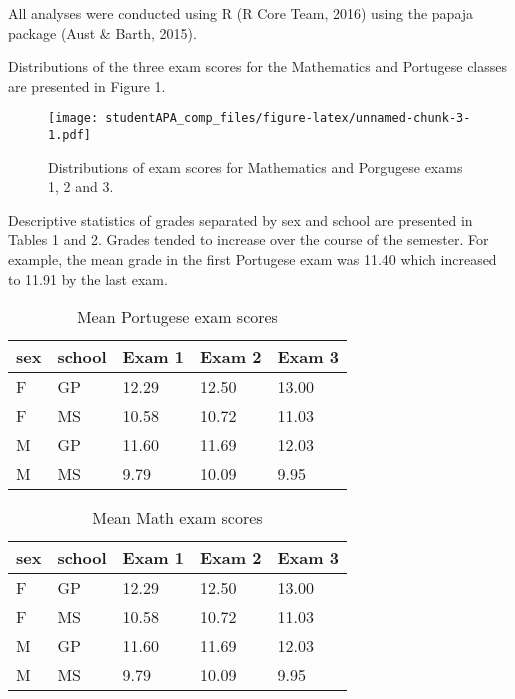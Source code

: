 \documentclass[english,floatsintext,man]{apa6}
\begin{document}
All analyses were conducted using R (R Core Team, 2016) using the papaja
package (Aust \& Barth, 2015).

Distributions of the three exam scores for the Mathematics and Portugese
classes are presented in Figure 1.

\begin{figure}[htbp]
\centering
\texttt{[image: studentAPA\_comp\_files/figure-latex/unnamed-chunk-3-1.pdf]}
\caption{\label{fig:unnamed-chunk-3}Distributions of exam scores for
Mathematics and Porgugese exams 1, 2 and 3.}
\end{figure}

Descriptive statistics of grades separated by sex and school are
presented in Tables 1 and 2. Grades tended to increase over the course
of the semester. For example, the mean grade in the first Portugese exam
was 11.40 which increased to 11.91 by the last exam.

\begin{table}[tbp]
\begin{center}
\begin{threeparttable}
\caption{Mean Portugese exam scores}
\begin{tabular}{lllll}
\toprule
sex & \multicolumn{1}{c}{school} & \multicolumn{1}{c}{Exam 1} & \multicolumn{1}{c}{Exam 2} & \multicolumn{1}{c}{Exam 3}\\
\midrule
F & GP & 12.29 & 12.50 & 13.00\\
F & MS & 10.58 & 10.72 & 11.03\\
M & GP & 11.60 & 11.69 & 12.03\\
M & MS & 9.79 & 10.09 & 9.95\\
\bottomrule
\end{tabular}
\end{threeparttable}
\end{center}
\end{table}

\begin{table}[tbp]
\begin{center}
\begin{threeparttable}
\caption{Mean Math exam scores}
\begin{tabular}{lllll}
\toprule
sex & \multicolumn{1}{c}{school} & \multicolumn{1}{c}{Exam 1} & \multicolumn{1}{c}{Exam 2} & \multicolumn{1}{c}{Exam 3}\\
\midrule
F & GP & 12.29 & 12.50 & 13.00\\
F & MS & 10.58 & 10.72 & 11.03\\
M & GP & 11.60 & 11.69 & 12.03\\
M & MS & 9.79 & 10.09 & 9.95\\
\bottomrule
\end{tabular}
\end{threeparttable}
\end{center}
\end{table}
\end{document}
